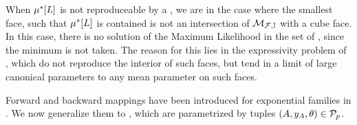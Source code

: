 When $\mu^*[L]$ is not reproduceable by a \HybridLogicNetwork{}, we are in the case where the smallest face, such that $\mu^*[L]$ is contained is not an intersection of $\mathcal{M}_{\mathcal{F},\mathbb{I}}$ with a cube face.
In this case, there is no solution of the Maximum Likelihood  in the set of \HybridLogicNetworks{}, since the minimum is not taken.
The reason for this lies in the expressivity problem of \HybridLogicNetworks{}, which do not reproduce the interior of such faces, but tend in a limit of large canonical parameters to any mean parameter on such faces.



Forward and backward mappings have been introduced for exponential families in .
We now generalize them to \HybridLogicNetworks{}, which are parametrized by tuples $(A,y_{A},\theta)\in\mathcal{P}_{p}$.

